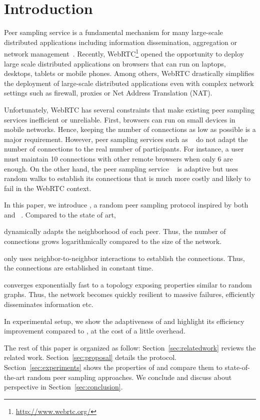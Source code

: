 
\section{Introduction}

Peer sampling service is a fundamental mechanism for many large-scale
distributed applications including information dissemination, aggregation or
network management~\cite{jelasity2007gossip}. Recently,
WebRTC\footnote{\url{http://www.webrtc.org/}} opened the opportunity to deploy
large scale distributed applications on browsers that can run on laptops,
desktops, tablets or mobile phones. Among others, WebRTC drastically simplifies the
deployment of large-scale distributed applications even with complex network settings
such as firewall, proxies or Net Address Translation (NAT).

Unfortunately, WebRTC has several constraints that make existing peer
sampling services inefficient or unreliable. First, browsers can run
on small devices in mobile networks. Hence, keeping the number of
connections as low as possible is a major requirement. However, peer
sampling services such as \CYCLON~\cite{voulgaris2005cyclon} do not
adapt the number of connections to the real number of
participants. For instance, a user must maintain 10 connections with
other remote browsers when only 6 are enough. On the other hand, the
peer sampling service \SCAMP~\cite{ganesh2003peer} is adaptive but
uses random walks to establish its connections that is much more
costly and likely to fail in the WebRTC context.

In this paper, we introduce \SPRAY, a random peer sampling protocol inspired
by both \CYCLON~\cite{voulgaris2005cyclon} and
\SCAMP~\cite{ganesh2003peer}. Compared to the state of art,
\begin{inparaenum}[(i)]
\item \SPRAY dynamically adapts the neighborhood of each peer. Thus, the number of
  connections grows logarithmically compared to the size of the network.
\item \SPRAY only uses neighbor-to-neighbor interactions to establish the
  connections. Thus, the connections are established in constant time.
\item \SPRAY converges exponentially fast to a topology exposing properties similar
  to random graphs. Thus, the network becomes quickly resilient to massive
  failures, efficiently disseminates information etc.
\item In experimental setup, we show the adaptiveness of \SPRAY and
  highlight its efficiency improvement compared to \CYCLON, at the cost of a
  little overhead.
\end{inparaenum}

The rest of this paper is organized as follow: Section~\ref{sec:relatedwork}
reviews the related work. Section~\ref{sec:proposal} details the \SPRAY
protocol.  Section~\ref{sec:experiments} shows the properties of \SPRAY
and compare them to state-of-the-art random peer sampling approaches. We
conclude and discuss about perspective in Section~\ref{sec:conclusion}.


